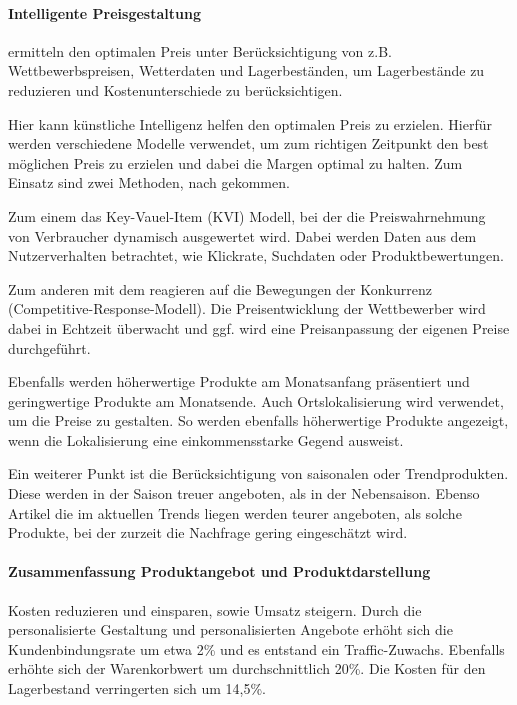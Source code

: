 \paragraph{Intelligente Preisgestaltung} ermitteln den optimalen Preis unter Berücksichtigung von z.B. Wettbewerbspreisen, Wetterdaten und Lagerbeständen, um Lagerbestände zu reduzieren und Kostenunterschiede zu berücksichtigen.\vspace{0.2cm}

Hier kann künstliche Intelligenz helfen den optimalen Preis zu erzielen. Hierfür werden verschiedene Modelle verwendet, um zum richtigen Zeitpunkt den best möglichen Preis zu erzielen und dabei die Margen optimal zu halten. Zum Einsatz sind zwei Methoden, nach \cite{mckinsey_dynamic_pricing} gekommen.\vspace{0.2cm}

Zum einem das Key-Vauel-Item (KVI) Modell, bei der die Preiswahrnehmung von Verbraucher dynamisch ausgewertet wird. Dabei werden Daten aus dem Nutzerverhalten betrachtet, wie Klickrate, Suchdaten oder Produktbewertungen.\vspace{0.2cm}

Zum anderen mit dem reagieren auf die Bewegungen der Konkurrenz (Competitive-Response-Modell). Die Preisentwicklung der Wettbewerber wird dabei in Echtzeit überwacht und ggf. wird eine Preisanpassung der eigenen Preise durchgeführt.\vspace{0.2cm}

Ebenfalls werden höherwertige Produkte am Monatsanfang präsentiert und geringwertige Produkte am Monatsende. Auch Ortslokalisierung wird verwendet, um die Preise zu gestalten. So werden ebenfalls höherwertige Produkte angezeigt, wenn die Lokalisierung eine einkommensstarke Gegend ausweist.\vspace{0.2cm}

Ein weiterer Punkt ist die Berücksichtigung von saisonalen oder Trendprodukten. Diese werden in der Saison treuer angeboten, als in der Nebensaison. Ebenso Artikel die im aktuellen Trends liegen werden teurer angeboten, als solche Produkte, bei der zurzeit die Nachfrage gering eingeschätzt wird.

\paragraph{Zusammenfassung Produktangebot und Produktdarstellung} Kosten reduzieren und einsparen, sowie Umsatz steigern. Durch die personalisierte Gestaltung und personalisierten Angebote erhöht sich die Kundenbindungsrate um etwa 2\% und es entstand ein Traffic-Zuwachs. Ebenfalls erhöhte sich der Warenkorbwert um durchschnittlich 20\%. Die Kosten für den Lagerbestand verringerten sich um 14,5\%.\vspace{0.2cm}

